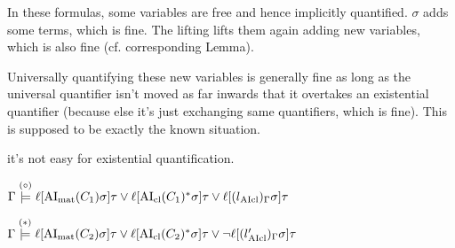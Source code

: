 \documentclass[,%
	paper=a4,%
	DIV10, %
	twoside=false,%
	liststotoc,
	bibtotoc,
	draft=false,%
	numbers=noendperiod
]{scrartcl}
\begin{document}
In these formulas, some variables are free and hence implicitly quantified. 
$\sigma$ adds some terms, which is fine. The lifting lifts them again adding new variables, which is also fine (cf.{} corresponding Lemma).

Universally quantifying these new variables is generally fine as long as the universal quantifier isn't moved as far inwards that it overtakes an existential quantifier (because else it's just exchanging same quantifiers, which is fine).
This is supposed to be exactly the known situation. 

it's not easy for existential quantification.





			$\Gamma \stackrel{(\circ)}{\models} \ell[\operatorname{AI}_\mathrm{mat}(C_1)\sigma]\tau \lor \ell[\operatorname{AI}_\mathrm{cl}(C_1)^*\sigma]\tau \lor \ell[(l{_{\operatorname{AIcl}}})_\Gamma\sigma]\tau$

			$\Gamma \stackrel{(*)}{\models} \ell[\operatorname{AI}_\mathrm{mat}(C_2)\sigma]\tau \lor \ell[\operatorname{AI}_\mathrm{cl}(C_2)^*\sigma]\tau \lor \lnot \ell[(l{_{\operatorname{AIcl}}'})_\Gamma\sigma]\tau$
\end{document}
